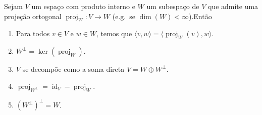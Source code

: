 \begin{theorem}
	Sejam $V$ um espaço com produto interno e $W$ um subespaço de $V$ que admite uma projeção ortogonal $\operatorname{proj}_W\colon V\to W$ (e.g.\ se $\dim(W)<\infty$).Então
	\begin{enumerate}
		\item Para todos $v\in V$ e $w\in W$, temos que $\langle v,w\rangle=\langle\operatorname{proj}_W(v),w\rangle$.
		\item $W^\perp=\ker(\operatorname{proj}_{W})$.
		\item $V$ se decompõe como a soma direta $V=W\oplus W^\perp$.
		\item $\operatorname{proj}_{W^\perp}=\operatorname{id}_V-\operatorname{proj}_W$.
		\item $\left(W^\perp\right)^\perp=W$.
	\end{enumerate}
\end{theorem}

